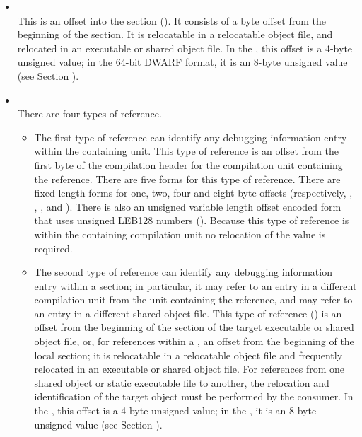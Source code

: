 \begin{itemize}
\item \CLASSrnglistsptr \\
This is an offset
into the \dotdebugrnglists{} section (\DWFORMsecoffset). 
It consists of a byte offset from the beginning of the 
\dotdebugrnglists{} section.
It is relocatable in a relocatable object file, and relocated 
in an executable or shared object file.
In the \thirtytwobitdwarfformat, this offset
is a 4-byte unsigned value; in the 64-bit DWARF
format, it is an 8-byte unsigned value (see Section
).

\item \CLASSreference \\
There are four types of reference.
\begin{itemize}
\item
The first type of reference can identify any debugging
information entry within the containing unit. 
This type of reference is an 
offset
from the first byte of the compilation
header for the compilation unit containing the reference. There
are five forms for this type of reference. There are fixed
length forms for one, two, four and eight byte offsets
(respectively,
\DWFORMrefnMARK 
\DWFORMrefoneTARG, 
\DWFORMreftwoTARG, 
\DWFORMreffourTARG,
and \DWFORMrefeightTARG). 
There is also an unsigned variable
length offset encoded form that uses 
unsigned LEB128 numbers
(\DWFORMrefudataTARG). 
Because this type of reference is within
the containing compilation unit no relocation of the value
is required.

\item
The second type of reference can identify any debugging
information entry within a 
\dotdebuginfo{} section; in particular,
it may refer to an entry in a different compilation unit
from the unit containing the reference, and may refer to an
entry in a different shared object file.  This type of reference
(\DWFORMrefaddrTARG) 
is an offset from the beginning of the
\dotdebuginfo{} 
section of the target executable or shared object file, or, for
references within a , 
an offset from the beginning of the local \dotdebuginfo{} section;
it is relocatable in a relocatable object file and frequently
relocated in an executable or shared object file. For
references from one shared object or static executable file
to another, the relocation and identification of the target
object must be performed by the consumer. In the 
\thirtytwobitdwarfformat, this offset is a 4-byte unsigned value; 
in the \sixtyfourbitdwarfformat, it is an 8-byte
unsigned value 
(see Section ).


\end{itemize}
\end{itemize}

